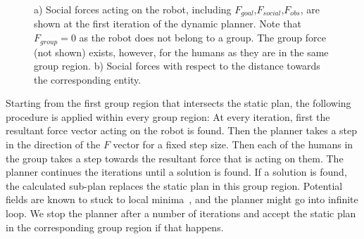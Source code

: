 \begin{figure}[ht!]
\centering
%
    \caption{%
	a) Social forces acting on the robot, including $F_{goal}$,$F_{social}$,$F_{obs}$, are shown at the first iteration of the dynamic planner. Note that $F_{group}=0$ as the robot does not belong to a group. The group force (not shown) exists, however, for the humans as they are in the same group region. b) Social forces with respect to the distance towards the corresponding entity.
     }%
   \label{fig:forces}
\end{figure}


Starting from the first group region that intersects the static plan, the following procedure is applied within every group region: At every iteration, first the resultant force vector acting on the robot is found. Then the planner takes a step in the direction of the $F$ vector for a fixed step size. Then each of the humans in the group takes a step towards the resultant force that is acting on them. The planner continues the iterations until a solution is found. If a solution is found, the calculated sub-plan replaces the static plan in this group region. Potential fields are known to stuck to local minima~\cite{koren1991potential}, and the planner might go into infinite loop. We stop the planner after a number of iterations and accept the static plan in the corresponding group region if that happens.


